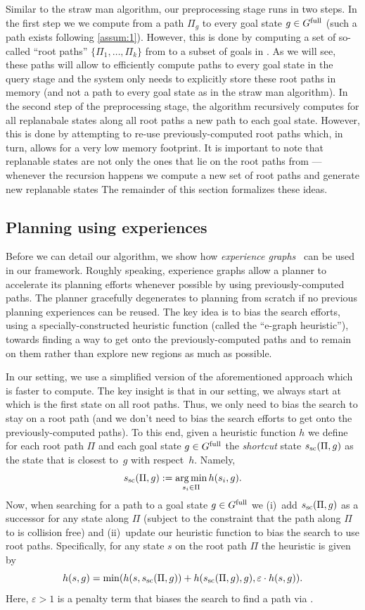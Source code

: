 \documentclass[conference]{IEEEtran}
\DeclareMathOperator*{\argmin}{arg\,min}
\begin{document}
Similar to the straw man algorithm, our preprocessing stage runs in two steps.
In the first step we we compute from \Shome a path $\Pi_g$ to every goal state $ g \in G^{\textrm{full}}$ (such a path exists following \ref{assum:1}). However, this is done by computing a set of so-called ``root paths'' $\{\Pi_1, \ldots, \Pi_k \}$ from \Shome to a subset of goals in \Gfull. 
As we will see, these paths will allow to efficiently compute paths to every goal state in the query stage and the system only needs to explicitly store these root paths in memory (and not a path to every goal state as in the straw man algorithm).
%
In the second step of the preprocessing stage, the algorithm recursively computes for all replanabale states along all root paths a new path to each goal state. However, this is done by attempting to re-use previously-computed root paths which, in turn, allows for a very low memory footprint.
%
It is important to note that replanable states are not only the ones that lie on the root paths from \Shome---whenever the recursion happens we compute a new set of root paths and generate new replanable states
%
The remainder of this section formalizes these ideas.


\subsection{Planning using experiences}
\label{subsec:experience}
Before we can detail our algorithm, we show how \emph{experience graphs}~\cite{PCCL12} can be used in our framework.
%
Roughly speaking, experience graphs allow a planner  to accelerate its planning efforts whenever possible by using previously-computed paths. The planner gracefully degenerates to planning from scratch if no previous planning experiences can be reused.
%
The key idea is to bias the search efforts, using a specially-constructed heuristic function (called the ``e-graph heuristic''), towards finding a way to get onto the previously-computed paths and to remain on them rather than explore new regions as much as possible. 

In our setting, we use a simplified version of the aforementioned approach which is faster to compute.
%
The key insight is that in our setting, we always start at \Shome which is the first state on all root paths. Thus, we only need to bias the search to stay on a root path (and we don't need to bias the search efforts to get onto the previously-computed paths).
%
To this end, given a heuristic function $h$ we define for each root path $\Pi$ and each goal state $g \in G^{\textrm{full}}$ the \emph{shortcut} state $s_{\textrm{sc}} (\Pi,g)$ as the   state that is closest to~$g$ with respect~$h$.
Namely,
$$
\Ssc (\Pi,g) := \argmin\limits_{s_i \in \Pi} h(s_i, g).
$$
Now, when searching for a path to a goal state $g \in G^{\textrm{full}}$ we
(i)~add $s_{\textrm{sc}} (\Pi,g)$ as a successor for any state along $\Pi$
(subject to the constraint that the path along $\Pi$ to \Ssc is collision free)
and
(ii)~update our heuristic function to bias the search to use root paths. Specifically, for any state $s$ on the root path $\Pi$ the heuristic is given by
$$
h(s,g) = \min(h(s,s_{\textrm{sc}} (\Pi,g)) + h(s_{\textrm{sc}} (\Pi,g),g), \varepsilon \cdot h(s,g)).
$$
Here, $\varepsilon>1$ is a penalty term that biases the search to find a path via \Ssc.
\end{document}
